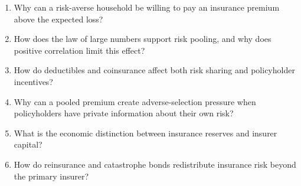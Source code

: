 \begin{enumerate}

\item Why can a risk-averse household be willing to pay an insurance premium above the expected loss?

\item How does the law of large numbers support risk pooling, and why does positive correlation limit this effect?

\item How do deductibles and coinsurance affect both risk sharing and policyholder incentives?

\item Why can a pooled premium create adverse-selection pressure when policyholders have private information about their own risk?

\item What is the economic distinction between insurance reserves and insurer capital?

\item How do reinsurance and catastrophe bonds redistribute insurance risk beyond the primary insurer?

\end{enumerate}






